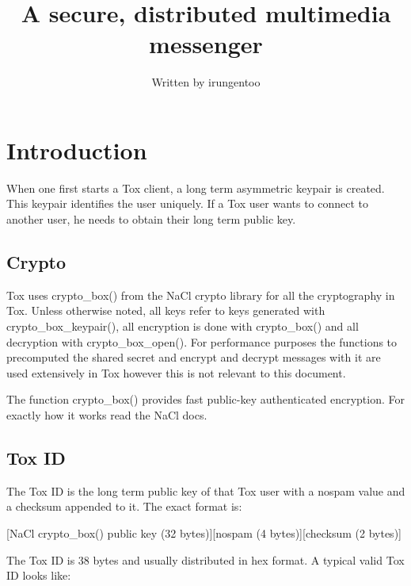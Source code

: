 \documentclass{tox}
\begin{document}
\title{A secure, distributed multimedia messenger}


\author{Written by irungentoo} %

\maketitle

\section{Introduction}

When one first starts a Tox client, a long term asymmetric keypair is created. 
This keypair identifies the user uniquely. If a Tox user wants to connect to 
another user, he needs to obtain their long term public key. 

\subsection{Crypto}

Tox uses crypto\_box() from the NaCl crypto library for all the cryptography in 
Tox. Unless otherwise noted, all keys refer to keys generated with 
crypto\_box\_keypair(), all encryption is done with crypto\_box() and all 
decryption with crypto\_box\_open(). For performance purposes the functions to 
precomputed the shared secret and encrypt and decrypt messages with it are used 
extensively in Tox however this is not relevant to this document.

The function crypto\_box() provides fast public-key authenticated encryption. 
For exactly how it works read the NaCl docs.

\subsection{Tox ID}

The Tox ID is the long term public key of that Tox user with a nospam value and 
a checksum appended to it. The exact format is:

[NaCl crypto\_box() public key (32 bytes)][nospam (4 bytes)][checksum (2 bytes)]

The Tox ID is 38 bytes and usually distributed in hex format. A typical valid 
Tox ID looks like:
\end{document}

